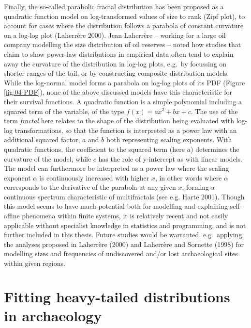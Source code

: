 \documentclass[
  12pt,
]{book}
\begin{document}
Finally, the so-called parabolic fractal distribution has been proposed as a quadratic function model on log-transformed values of size to rank (Zipf plot), to account for cases where the distribution follows a parabola of constant curvature on a log-log plot (Laherrère 2000). Jean Laherrère -- working for a large oil company modelling the size distribution of oil reserves -- noted how studies that claim to show power-law distributions in empirical data often tend to explain away the curvature of the distribution in log-log plots, e.g.~by focussing on shorter ranges of the tail, or by constructing composite distribution models. While the log-normal model forms a parabola on log-log plots of its PDF (Figure \ref{fig:04-PDF}), none of the above discussed models have this characteristic for their survival functions. A quadratic function is a simple polynomial including a squared term of the variable, of the type \(f(x) = ax^2 + bx + c\). The use of the term \emph{fractal} here relates to the shape of the distribution being evaluated with log-log transformations, so that the function is interpreted as a power law with an additional squared factor, \(a\) and \(b\) both representing scaling exponents. With quadratic functions, the coefficient to the squared term (here \(a\)) determines the curvature of the model, while \(c\) has the role of y-intercept as with linear models. The model can furthermore be interpreted as a power law where the scaling exponent \(\alpha\) is continuously increased with higher \(x\), in other words where \(\alpha\) corresponds to the derivative of the parabola at any given \(x\), forming a continuous spectrum characteristic of multifractals (see e.g. Harte 2001). Though this model seems to have much potential both for modelling and explaining self-affine phenomena within finite systems, it is relatively recent and not easily applicable without specialist knowledge in statistics and programming, and is not further included in this thesis. Future studies would be warranted, e.g.~applying the analyses proposed in Laherrère (2000) and Laherrère and Sornette (1998) for modelling sizes and frequencies of undiscovered and/or lost archaeological sites within given regions.

\hypertarget{distfit-archaeo}{%
\section{Fitting heavy-tailed distributions in archaeology}\label{distfit-archaeo}}
\end{document}
